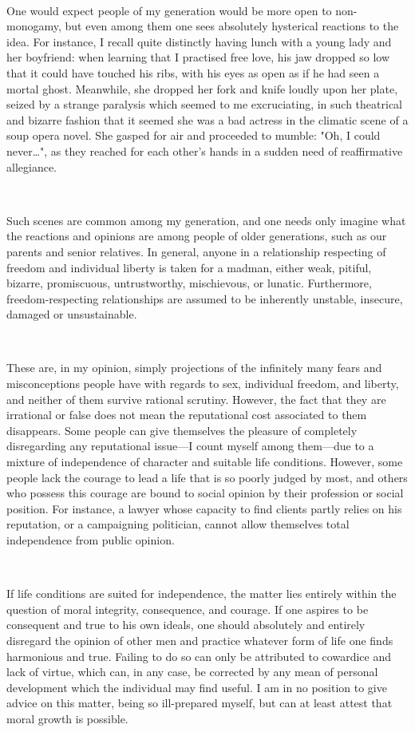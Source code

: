 \documentclass[a4paper, 12pt]{article}
\begin{document}
~ 

One would expect people of my generation would be more open to non-monogamy,
but even among them one sees absolutely hysterical reactions to the idea. For
instance, I recall quite distinctly having lunch with a young lady and her
boyfriend: when learning that I practised free love, his jaw dropped so low
that it could have touched his ribs, with his eyes as open as if he had seen a
mortal ghost. Meanwhile, she dropped her fork and knife loudly upon her plate,
seized by a strange paralysis which seemed to me excruciating, in such
theatrical and bizarre fashion that it seemed she was a bad actress
in the climatic scene of a soup opera novel. She gasped for air and
proceeded to mumble: "Oh, I could never\ldots", as they reached for each
other's hands in a sudden need of reaffirmative allegiance. 

~ 

Such scenes are common among my generation, and one needs only imagine what the
reactions and opinions are among people of older generations, such as our
parents and senior relatives. In general, anyone in a relationship respecting
of freedom and individual liberty is taken for a madman, either weak,
pitiful, bizarre, promiscuous, untrustworthy, mischievous, or lunatic. Furthermore,
freedom-respecting relationships are assumed to be inherently unstable, insecure, damaged or 
unsustainable. 

~

These are, in my opinion, simply projections of the infinitely many fears and
misconceptions people have with regards to sex, individual freedom, and
liberty, and neither of them survive rational scrutiny. However, the fact that
they are irrational or false does not mean the reputational cost associated to them 
disappears. Some people can give themselves the pleasure of completely disregarding 
any reputational issue---I count myself among them---due to a mixture of independence of 
character and suitable life conditions. However, some people lack the courage to lead 
a life that is so poorly judged by most, and others who
possess this courage are bound to social opinion by their profession or
social position. For instance, a lawyer whose capacity to find clients partly
relies on his reputation, or a campaigning politician, cannot allow themselves total 
independence from public opinion.

~

If life conditions are suited for independence, the matter lies entirely within
the question of moral integrity, consequence, and courage. If one aspires to be
consequent and true to his own ideals, one should absolutely and entirely
disregard the opinion of other men and practice whatever form of life one finds
harmonious and true. Failing to do so can only be attributed to cowardice and
lack of virtue, which can, in any case, be corrected by any mean of personal
development which the individual may find useful. I am in no position to give
advice on this matter, being so ill-prepared myself, but can at least attest that 
moral growth is possible.
\end{document}

